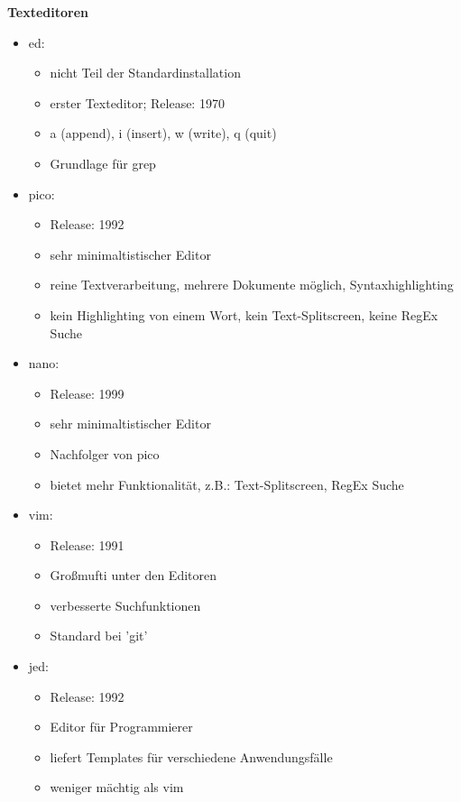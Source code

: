 \documentclass[12pt,utf8, 10pt]{article}
\begin{document}
\textbf{Texteditoren}
\begin{itemize}
	\item ed:
	\begin{itemize}
		\item nicht Teil der Standardinstallation
		\item erster Texteditor; Release: 1970
		\item a (append), i (insert), w (write), q (quit)
		\item Grundlage für grep
	\end{itemize}
	\item pico:
	\begin{itemize}
		\item Release: 1992
		\item sehr minimaltistischer Editor
		\item reine Textverarbeitung, mehrere Dokumente möglich, Syntaxhighlighting
		\item kein Highlighting von einem Wort, kein Text-Splitscreen, keine RegEx Suche 
	\end{itemize}
	\item nano:
	\begin{itemize}
		\item Release: 1999
		\item sehr minimaltistischer Editor
		\item Nachfolger von pico
		\item bietet mehr Funktionalität, z.B.: Text-Splitscreen, RegEx Suche
	\end{itemize}
	\item vim:
	\begin{itemize}
		\item Release: 1991
		\item Großmufti unter den Editoren
		\item verbesserte Suchfunktionen
		\item Standard bei 'git'
	\end{itemize}
	\item jed:
	\begin{itemize}
		\item Release: 1992
		\item Editor für Programmierer
		\item liefert Templates für verschiedene Anwendungsfälle
		\item weniger mächtig als vim
	\end{itemize}
\end{itemize}
\end{document}
